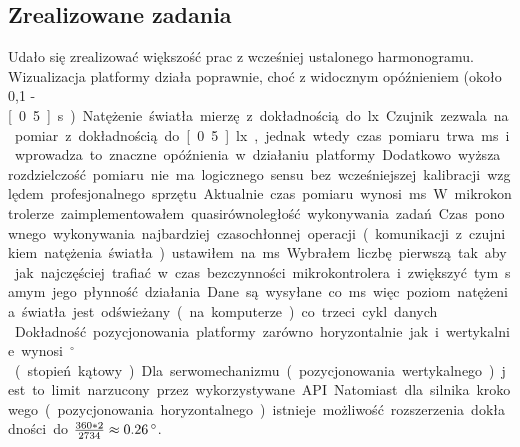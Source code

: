 \documentclass[10pt, a4paper]{article}
\begin{document}
	\subsection{Zrealizowane zadania}
	Udało się zrealizować większość prac z wcześniej ustalonego harmonogramu. Wizualizacja platformy działa poprawnie, choć z widocznym opóźnieniem (około 0,1 - \unit[0.5]{s}). Natężenie światła mierzę z dokładnością do \unit[4]{lx}. Czujnik zezwala na pomiar z dokładnością do \unit[0.5]{lx}, jednak wtedy czas pomiaru trwa \unit[120]{ms} i wprowadza to znaczne opóźnienia w działaniu platformy. Dodatkowo wyższa rozdzielczość pomiaru nie ma logicznego sensu bez wcześniejszej kalibracji względem profesjonalnego sprzętu. Aktualnie czas pomiaru wynosi \unit[16]{ms}. W mikrokontrolerze zaimplementowałem quasirównoległość wykonywania zadań. Czas ponownego wykonywania najbardziej czasochłonnej operacji (komunikacji z czujnikiem natężenia światła) ustawiłem na \unit[277]{ms}. Wybrałem liczbę pierwszą tak aby jak najczęściej trafiać w czas bezczynności mikrokontrolera i zwiększyć tym samym jego płynność działania. Dane są wysyłane co \unit[100]{ms} więc poziom natężenia światła jest odświeżany (na komputerze) co trzeci cykl danych. \\
	Dokładność pozycjonowania platformy zarówno horyzontalnie jak i wertykalnie wynosi \unit[1]{$^{\circ}$} (stopień kątowy). Dla serwomechanizmu (pozycjonowania wertykalnego) jest to limit narzucony przez wykorzystywane API. Natomiast dla silnika krokowego (pozycjonowania horyzontalnego) istnieje możliwość rozszerzenia dokładności do $\frac{360 * 2}{2734} \approx \unit[0.26]{^{\circ}}$.
\end{document}
